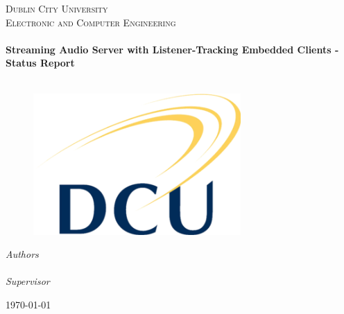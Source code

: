\begin{titlepage}
  \begin{center}

    \textsc{\LARGE Dublin City University}\\[1.5cm]
    \textsc{\Large Electronic and Computer Engineering}\\[0.5cm]

    \HRule\\[0.4cm]
    {\huge \bfseries Streaming Audio Server with Listener-Tracking Embedded Clients - Status Report\\[0.4cm]}
    \HRule\\[1.5cm]
	
    \begin{figure}[H]
	\includegraphics{images/Dcu-logo.png}
	\centering
    \end{figure}

    \emph{Authors}\\[0.1cm]
    \noindent{}\\[1cm]

    \emph{Supervisor}
    \noindent{}\\[1cm]

    \vfill

    {\large \today}

  \end{center}
\end{titlepage}
